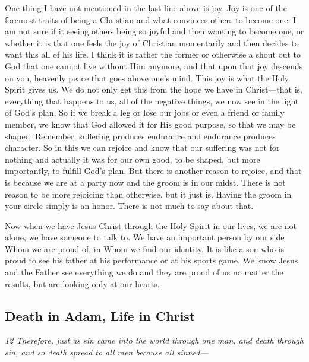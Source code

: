 One thing I have not mentioned in the last line above is joy. Joy is one
of the foremost traits of being a Christian and what convinces others to
become one. I am not sure if it seeing others being so joyful and then
wanting to become one, or whether it is that one feels the joy of
Christian momentarily and then decides to want this all of his life. I
think it is rather the former or otherwise a shout out to God that one
cannot live without Him anymore, and that upon that joy descends on you,
heavenly peace that goes above one's mind. This joy is what the Holy
Spirit gives us. We do not only get this from the hope we have in
Christ---that is, everything that happens to us, all of the negative
things, we now see in the light of God's plan. So if we break a leg or
lose our jobs or even a friend or family member, we know that God
allowed it for His good purpose, so that we may be shaped. Remember,
suffering produces endurance and endurance produces character. So in
this we can rejoice and know that our suffering was not for nothing and
actually it was for our own good, to be shaped, but more importantly, to
fulfill God's plan. But there is another reason to rejoice, and that is
because we are at a party now and the groom is in our midst. There is
not reason to be more rejoicing than otherwise, but it just is. Having
the groom in your circle simply is an honor. There is not much to say
about that.

Now when we have Jesus Christ through the Holy Spirit in our lives, we
are not alone, we have someone to talk to. We have an important person
by our side Whom we are proud of, in Whom we find our identity. It is
like a son who is proud to see his father at his performance or at his
sports game. We know Jesus and the Father see everything we do and they
are proud of us no matter the results, but are looking only at our
hearts.

\subsection{Death in Adam, Life in Christ} \emph{12 Therefore, just as sin
came into the world through one man, and death through sin, and so death
spread to all men because all sinned---}

